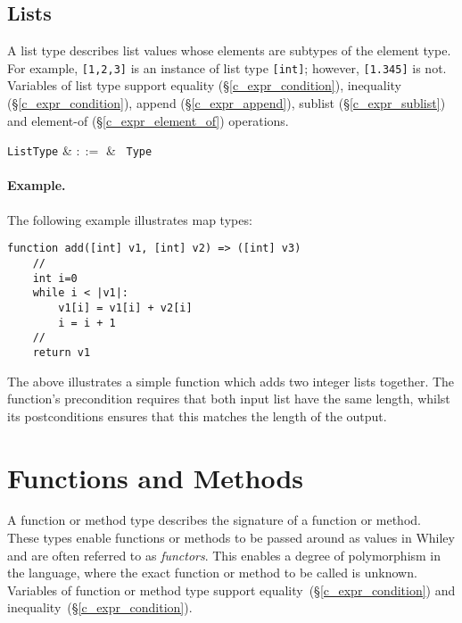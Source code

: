 
\subsection{Lists}
\label{c_types_list}

A list type describes list values whose elements are subtypes of the element type. For example, \lstinline{[1,2,3]} is an instance of list type \lstinline{[int]}; however, \lstinline{[1.345]} is not.  Variables of list type support equality (\S\ref{c_expr_condition}), inequality (\S\ref{c_expr_condition}), append (\S\ref{c_expr_append}), sublist (\S\ref{c_expr_sublist}) and element-of (\S\ref{c_expr_element_of}) operations.

\begin{syntax}
  \verb+ListType+ & $::=$ & \token{[} \ \verb+Type+ \ \token{]}\\
\end{syntax}

\paragraph{Example.} The following example illustrates map types:

\begin{lstlisting}
function add([int] v1, [int] v2) => ([int] v3)
    //
    int i=0
    while i < |v1|:
        v1[i] = v1[i] + v2[i]
        i = i + 1 
    //
    return v1
\end{lstlisting}

The above illustrates a simple function which adds two integer lists together.  The function's \gls{precondition} requires that both input list have the same length, whilst its \gls{postcondition}s ensures that this matches the length of the output.


\section{Functions and Methods}
A function or method type describes the signature of a function or method.  These types enable functions or methods to be passed around as values in Whiley and are often referred to as {\em functors}.  This enables a degree of polymorphism in the language, where the exact function or method to be called is unknown.   Variables of function or method type support equality~(\S\ref{c_expr_condition}) and inequality~(\S\ref{c_expr_condition}).

